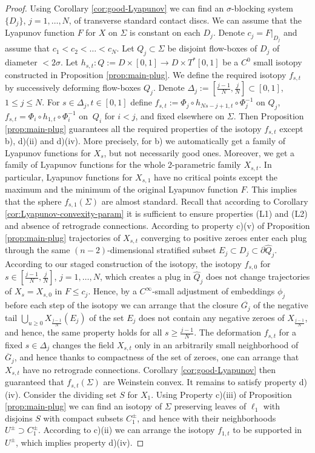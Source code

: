 \documentclass[12pt]{amsart}
\theoremstyle{plain}
\theoremstyle{definition}
\theoremstyle{remark}
\newcommand{\p}{\partial}
\newcommand{\wh}{\widehat}
\newcommand{\ol}{\overline}
\begin{document}
  \begin{proof}
 
  
   Using Corollary \ref{cor:good-Lyapunov} we can find  an  $\sigma$-blocking  system  $\{D_j\}  $, $j=1,\dots, N$,   of transverse  standard contact  discs. We can assume that  
   the Lyapunov function $F$ for $X$ on $\Sigma$ is constant on each $D_j$. Denote $c_j=F|_{D_j}$ and assume   that $c_1< c_2<\dots< c_N$.
   Let $  Q_j\subset\Sigma $ be  disjoint flow-boxes of $D_j$ of diameter $<2\sigma$. 
 Let $h_{s,t}:  Q:=D\times[0,1]\to D\times T^*[0,1]$ be a $C^0$ small isotopy constructed in Proposition \ref{prop:main-plug}.  
We define the required isotopy $f_{s,t}$ by successively deforming flow-boxes $ Q_j$. Denote $\Delta_j:=[\frac{j-1}N,\frac{j}N]\subset[0,1]$, $1\leq j\leq N$.
For $  s\in\Delta_j, t\in[0,1]$ 
  define
 $f_{s,t}:=\Phi_j\circ h_{Ns-j+1,t}\circ \Phi_j^{-1}$ on $  Q_j$, 
 $f_{s,t}= \Phi_i\circ h_{1,t}\circ \Phi_i^{-1}$ on $\  Q_i$ for $i<j$, and fixed elsewhere on $\Sigma$. Then Proposition \ref{prop:main-plug} guarantees  all  the  required properties  of the isotopy $f_{s,t}$ except b), d)(ii) and d)(iv). More precisely, for b) we automatically get a family of Lyapunov functions for $X_s$, but not necessarily good ones. Moreover, we get a family of Lyapunov functions for the whole 2-parametric family  $X_{s,t}$. In particular, Lyapunov functions for $X_{s,1}$ have no critical points except the  maximum and the minimum of the  original Lyapunov function $F$. This implies that the sphere $f_{s,1}(\Sigma)$ are almost standard.   Recall that according to Corollary \ref{cor:Lyapunov-convexity-param} it is sufficient to  ensure properties (L1) and (L2) and absence  of retrograde connections.
    According to property c)(v) of Proposition \ref{prop:main-plug} trajectories of $X_{s,t}$ converging to positive zeroes enter each plug  through the same $(n-2)$-dimensional stratified subset $E_j\subset D_j\subset \p\wh Q_j$.  According to our staged construction of the isotopy, the isotopy $f_{s,0}$ for $s\in[\frac{j-1}N,\frac jN]$, $j=1,\dots, N$, which creates a plug in $\wh Q_j$  does not change  trajectories of $X_s=X_{s,0}$ in $F\leq c_j$. Hence, by a $C^\infty$-small adjustment of embeddings $\phi_j$ before each step of the isotopy we can arrange that the closure   $\overline{G_j}$  of the negative tail $\bigcup\limits_{u\geq 0}X_{\frac{j-1}N}(E_j)$ of the set $E_j$ does not contain any negative zeroes of $X_{\frac{j-1}N}$, and hence,  the same property holds for all $s\geq \frac{j-1}N$. The deformation $f_{s,t}$ for a fixed $s\in\Delta_j$ changes the field $X_{s,t}$ only in an arbitrarily small neighborhood of $\ol G_j$, and hence thanks to compactness of the set of zeroes, one can arrange that $X_{s,t}$ have no retrograde connections. Corollary \ref{cor:good-Lyapunov} then guaranteed that $f_{s,t}(\Sigma)$ are Weinstein convex. It remains to satisfy property
d)(iv). Consider the dividing set $S$ for $X_1$. Using  Property c)(iii) of Proposition \ref{prop:main-plug} we can find an isotopy of $\Sigma$ preserving leaves of $\ell_1$ with disjoins $S$ with  compact subsets $C_1^\pm$, and hence with their neighborhoods $U^\pm\supset C_1^\pm$.  According to  c)(ii)  we can arrange the isotopy $f_{1,t}$      to be supported in $U^\pm$, which implies property d)(iv).



\end{proof}
\end{document}

